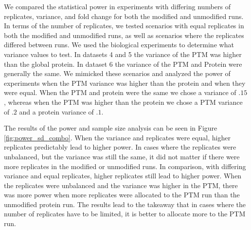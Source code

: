 \documentclass{mcp}
\begin{document}
We compared the statistical power in experiments with differing numbers of replicates, variance, and fold change for both the modified and unmodified runs. In terms of the number of replicates, we tested scenarios with equal replicates in both the modified and unmodified runs, as well as scenarios where the replicates differed between runs. We used the biological experiments to determine what variance values to test. In datasets 4 and 5 the variance of the PTM was higher than the global protein. In dataset 6 the variance of the PTM and Protein were generally the same. We mimicked these scenarios and analyzed the power of experiments when the PTM variance was higher than the protein and when they were equal. When the PTM and protein were the same we chose a variance of $.15$, whereas when the PTM was higher than the protein we chose a PTM variance of $.2$ and a protein variance of $.1$.

The results of the power and sample size analysis can be seen in Figure \ref{fig:power_sd_combo}. When the variance and replicates were equal, higher replicates predictably lead to higher power. In cases where the replicates were unbalanced, but the variance was still the same, it did not matter if there were more replicates in the modified or unmodified runs. In comparison, with differing variance and equal replicates, higher replicates still lead to higher power. When the replicates were unbalanced and the variance was higher in the PTM, there was more power when more replicates were allocated to the PTM run than the unmodified protein run. The results lead to the takeaway that in cases where the number of replicates have to be limited, it is better to allocate more to the PTM run.
\end{document}

